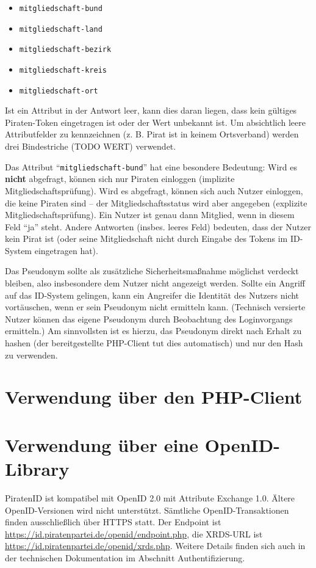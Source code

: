 \begin{itemize}
	\item \texttt{mitgliedschaft-bund}
	\item \texttt{mitgliedschaft-land}
	\item \texttt{mitgliedschaft-bezirk}
	\item \texttt{mitgliedschaft-kreis}
	\item \texttt{mitgliedschaft-ort}
\end{itemize}

Ist ein Attribut in der Antwort leer, kann dies daran liegen, dass kein gültiges Piraten-Token eingetragen ist oder der Wert unbekannt ist.
Um absichtlich leere Attributfelder zu kennzeichnen (z. B. Pirat ist in keinem Ortsverband) werden drei Bindestriche (TODO WERT) verwendet.

Das Attribut "`\texttt{mitgliedschaft-bund}"' hat eine besondere Bedeutung:
Wird es \textbf{nicht} abgefragt, können sich nur Piraten einloggen (implizite Mitgliedschaftsprüfung).
Wird es abgefragt, können sich auch Nutzer einloggen, die keine Piraten sind -- der Mitgliedschaftsstatus wird aber angegeben (explizite Mitgliedschaftsprüfung).
Ein Nutzer ist genau dann Mitglied, wenn in diesem Feld "`ja"' steht.
Andere Antworten (insbes. leeres Feld) bedeuten, dass der Nutzer kein Pirat ist (oder seine Mitgliedschaft nicht durch Eingabe des Tokens im ID-System eingetragen hat).


Das Pseudonym sollte als zusätzliche Sicherheitsmaßnahme möglichst verdeckt bleiben, also insbesondere dem Nutzer nicht angezeigt werden.
Sollte ein Angriff auf das ID-System gelingen, kann ein Angreifer die Identität des Nutzers nicht vortäuschen, wenn er sein Pseudonym nicht ermitteln kann.
(Technisch versierte Nutzer können das eigene Pseudonym durch Beobachtung des Loginvorgangs ermitteln.)
Am sinnvollsten ist es hierzu, das Pseudonym direkt nach Erhalt zu hashen (der bereitgestellte PHP-Client tut dies automatisch) und nur den Hash zu verwenden.


\newpage
\section{Verwendung über den PHP-Client}


\newpage
\section{Verwendung über eine OpenID-Library}
PiratenID ist kompatibel mit OpenID 2.0 mit Attribute Exchange 1.0. Ältere OpenID-Versionen wird nicht unterstützt.
Sämtliche OpenID-Transaktionen finden ausschließlich über HTTPS statt.
Der Endpoint ist \url{https://id.piratenpartei.de/openid/endpoint.php}, die XRDS-URL ist \url{https://id.piratenpartei.de/openid/xrds.php}.
Weitere Details finden sich auch in der technischen Dokumentation im Abschnitt Authentifizierung.

